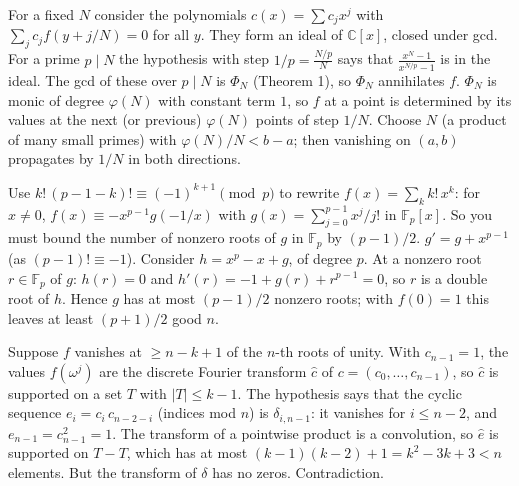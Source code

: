 \documentclass[11pt,a4paper]{article}
\begin{document}
 For a fixed $N$ consider the polynomials $c(x)=\sum c_jx^j$ with $\sum_jc_jf(y+j/N)=0$ for all $y$. They form an ideal of $\mathbb{C}[x]$, closed under gcd.
 For a prime $p\mid N$ the hypothesis with step $1/p=\frac{N/p}N$ says that $\frac{x^N-1}{x^{N/p}-1}$ is in the ideal. The gcd of these over $p\mid N$ is $\Phi_N$ (Theorem 1), so $\Phi_N$ annihilates $f$.
 $\Phi_N$ is monic of degree $\varphi(N)$ with constant term $1$, so $f$ at a point is determined by its values at the next (or previous) $\varphi(N)$ points of step $1/N$. Choose $N$ (a product of many small primes) with $\varphi(N)/N<b-a$; then vanishing on $(a,b)$ propagates by $1/N$ in both directions.

 Use $k!\,(p-1-k)!\equiv(-1)^{k+1}\pmod p$ to rewrite $f(x)=\sum_kk!\,x^k$: for $x\ne0$, $f(x)\equiv-x^{p-1}g(-1/x)$ with $g(x)=\sum_{j=0}^{p-1}x^j/j!$ in $\mathbb{F}_p[x]$. So you must bound the number of nonzero roots of $g$ in $\mathbb{F}_p$ by $(p-1)/2$.
 $g'=g+x^{p-1}$ (as $(p-1)!\equiv-1$). Consider $h=x^p-x+g$, of degree $p$.
 At a nonzero root $r\in\mathbb{F}_p$ of $g$: $h(r)=0$ and $h'(r)=-1+g(r)+r^{p-1}=0$, so $r$ is a double root of $h$. Hence $g$ has at most $(p-1)/2$ nonzero roots; with $f(0)=1$ this leaves at least $(p+1)/2$ good $n$.

 Suppose $f$ vanishes at $\ge n-k+1$ of the $n$-th roots of unity. With $c_{n-1}=1$, the values $f(\omega^j)$ are the discrete Fourier transform $\hat c$ of $c=(c_0,\dots,c_{n-1})$, so $\hat c$ is supported on a set $T$ with $|T|\le k-1$.
 The hypothesis says that the cyclic sequence $e_i=c_i\,c_{n-2-i}$ (indices mod $n$) is $\delta_{i,n-1}$: it vanishes for $i\le n-2$, and $e_{n-1}=c_{n-1}^2=1$.
 The transform of a pointwise product is a convolution, so $\hat e$ is supported on $T-T$, which has at most $(k-1)(k-2)+1=k^2-3k+3<n$ elements. But the transform of $\delta$ has no zeros. Contradiction.
\end{document}
